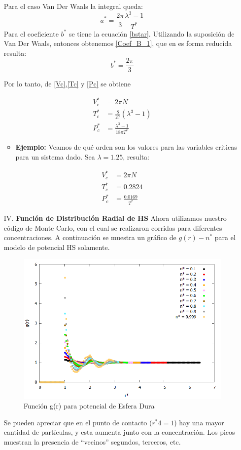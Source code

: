 \documentclass[12pt,letterpaper]{article}
\begin{document}
\begin{enumerate}
Para el caso Van Der Waals la integral queda:
\begin{equation}
a^* = \frac{2\pi}{3} \frac{\lambda^3-1}{T^*}
\end{equation}
Para el coeficiente $b^*$ se tiene la ecuación \eqref{bstar}. Utilizando la suposición de Van Der Waals, entonces obtenemos \eqref{Coef_B_1}, que en es forma reducida resulta:
\begin{equation}
b^* = \frac{2\pi}{3}
\end{equation}

Por lo tanto, de \eqref{Vc},\eqref{Tc} y \eqref{Pc} se obtiene

\begin{align}
V_c^* &= 2\pi N \label{Vcs} \\
T_c^* &= \frac{8}{27}(\lambda^3 -1) \label{Tcs}\\
P_c^* &= \frac{\lambda^3-1}{18\pi T^*} \label{Pcs}
\end{align}
\begin{itemize}
\item \textbf{Ejemplo:} Veamos de qué orden son los valores para las variables criticas para un sistema dado. Sea $\lambda=1.25$, resulta:
\end{itemize}
\begin{align*}
V_c^* &= 2\pi N  \\
T_c^* &= 0.2824 \\
P_c^* &= \frac{0.0169}{ T^*} 
\end{align*}


\item[IV.]\textbf{Función de Distribución Radial de HS} Ahora utilizamos nuestro código de Monte Carlo, con el cual se realizaron corridas para diferentes concentraciones. A continuación se muestra un gráfico de $g(r)-n^*$ para el modelo de potencial HS solamente.
\begin{figure}[H]
	\centering
	\includegraphics[width=0.75\linewidth]{GDR.png}
	\caption{Función g(r) para potencial de Esfera Dura}
	\label{Fig:GDR_HS}
\end{figure}
 Se pueden apreciar que en el punto de contacto ($r^*4=1$) hay una mayor cantidad de partículas, y esta aumenta junto con la concentración. Los picos muestran la presencia de ``vecinos'' segundos, terceros, etc.
 

\end{enumerate}
\end{document}
